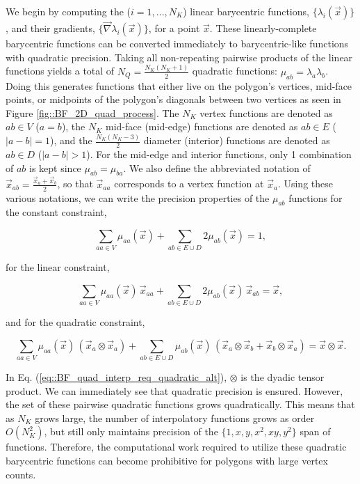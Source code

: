We begin by computing the ($i=1,...,N_K$) linear barycentric functions, $\{ \lambda_i (\vec{x}) \}$, and their gradients, $\{ \vec{\nabla} \lambda_i (\vec{x}) \}$, for a point $\vec{x}$. These linearly-complete barycentric functions can be converted immediately to barycentric-like functions with quadratic precision. Taking all non-repeating pairwise products of the linear functions yields a total of $N_Q=\frac{N_K(N_K+1)}{2}$ quadratic functions: $\mu_{ab} = \lambda_a \lambda_b$. Doing this generates functions that either live on the polygon's vertices, mid-face points, or midpoints of the polygon's diagonals between two vertices as seen in Figure \ref{fig::BF_2D_quad_process}. The $N_K$ vertex functions are denoted as $ab \in V$ ($a=b$), the $N_K$ mid-face (mid-edge) functions are denoted as $ab \in E$ ($|a-b|=1$), and the $\frac{N_K(N_K-3)}{2}$ diameter (interior) functions are denoted as $ab \in D$ ($|a-b| > 1$). For the mid-edge and interior functions, only 1 combination of $ab$ is kept since $\mu_{ab}=\mu_{ba}$. We also define the abbreviated notation of $\vec{x}_{ab} = \frac{\vec{x}_a + \vec{x}_b}{2}$, so that $\vec{x}_{aa}$ corresponds to a vertex function at $\vec{x}_a$. Using these various notations, we can write the precision properties of the $\mu_{ab}$ functions for the constant constraint,

\begin{equation}
\label{eq::BF_quad_interp_req_constant_alt}
\sum_{aa \in V}  \mu_{aa} (\vec{x}) + \sum_{ab \in E \cup D} 2 \mu_{ab} (\vec{x})  = 1 ,
\end{equation}

\noindent for the linear constraint,

\begin{equation}
\label{eq::BF_quad_interp_req_linear_alt}
\sum_{aa \in V}  \mu_{aa} (\vec{x}) \, \vec{x}_{aa} +  \sum_{ab \in E \cup D} 2  \mu_{ab} (\vec{x}) \, \vec{x}_{ab} = \vec{x} ,
\end{equation}

\noindent and for the quadratic constraint,

\begin{equation}
\label{eq::BF_quad_interp_req_quadratic_alt}
\sum_{aa \in V}  \mu_{aa} (\vec{x}) \, \left( \vec{x}_a \otimes \vec{x}_a \right) +  \sum_{ab \in E \cup D}   \mu_{ab} (\vec{x}) \, \left( \vec{x}_a \otimes \vec{x}_b + \vec{x}_b \otimes \vec{x}_a \right)   =  \vec{x} \otimes \vec{x} .
\end{equation}


\noindent In Eq. (\ref{eq::BF_quad_interp_req_quadratic_alt}), $\otimes$ is the dyadic tensor product. We can immediately see that quadratic precision is ensured. However, the set of these pairwise quadratic functions grows quadratically. This means that as $N_K$ grows large, the number of interpolatory functions grows as order $O(N_K^2)$, but still only maintains precision of the $\{ 1, x, y, x^2, xy, y^2 \}$ span of functions. Therefore, the computational work required to utilize these quadratic barycentric functions can become prohibitive for polygons with large vertex counts.

